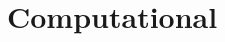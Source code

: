 \documentclass[a4paper]{article}
\title{}
\date{}
\begin{document}
\maketitle
    \section{Computational}
    
    
\end{document}
